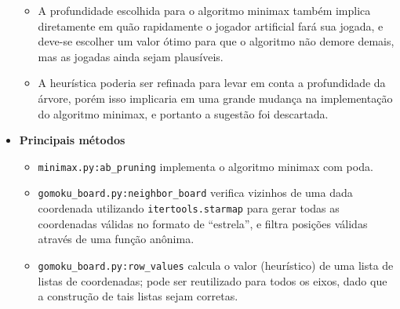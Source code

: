\documentclass{../../sftex/sftex}
\begin{document}
\begin{itemize}
\begin{itemize}
            \item A profundidade escolhida para o algoritmo minimax também
                implica diretamente em quão rapidamente o jogador artificial
                fará sua jogada, e deve-se escolher um valor ótimo para que o
                algoritmo não demore demais, mas as jogadas ainda sejam
                plausíveis.

            \item A heurística poderia ser refinada para levar em conta a
                profundidade da árvore, porém isso implicaria em uma grande
                mudança na implementação do algoritmo minimax, e portanto a
                sugestão foi descartada.

        \end{itemize}

    \item \textbf{Principais métodos}

        \begin{itemize}

            \item \texttt{minimax.py:ab\_pruning} implementa o algoritmo
                minimax com poda.

            \item \texttt{gomoku\_board.py:neighbor\_board} verifica
                vizinhos de uma dada coordenada utilizando
                \texttt{itertools.starmap} para gerar todas as coordenadas
                válidas no formato de ``estrela'', e filtra posições válidas
                através de uma função anônima.

            \item \texttt{gomoku\_board.py:row\_values} calcula o valor
                (heurístico) de uma lista de listas de coordenadas; pode ser
                reutilizado para todos os eixos, dado que a construção de tais
                listas sejam corretas.

        \end{itemize}

\end{itemize}
\end{document}
